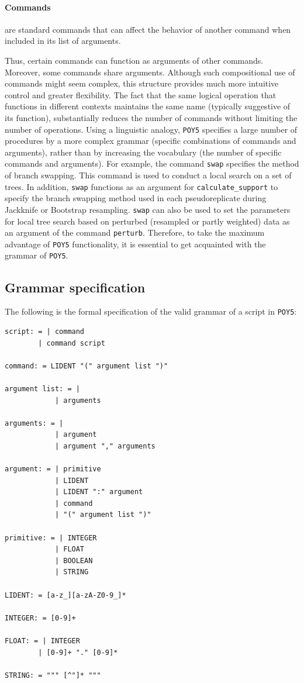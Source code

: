 \documentclass[11pt]{book}
\newcommand{\commandstyle}[1]{\texttt{#1}}
\newcommand{\poycommand}[1]{\commandstyle{#1}}
\newcommand{\poy}{\commandstyle{POY5}\xspace}
\begin{document}
\paragraph{Commands} are standard commands that can affect the behavior of
another command when included in its list of arguments.

Thus, certain commands can function as arguments of other commands. Moreover,
some commands share arguments. Although such compositional use of commands
might seem complex, this structure provides much more intuitive
control and greater flexibility. The fact that the same logical operation that functions
in different contexts maintains
the same name (typically suggestive of its function), substantially reduces the number of
commands without limiting the number of operations. Using a linguistic analogy,
\poy specifies a large number of procedures by a more complex grammar (specific
combinations of commands and arguments), rather than by increasing the vocabulary
(the number of specific commands and arguments). For example, the command
\poycommand{swap} specifies the method of branch swapping. This command is
used to conduct a local search on a set of trees. In addition,
\poycommand{swap} functions as an argument for \poycommand{calculate\_support}
to specify the branch swapping method used in each pseudoreplicate during Jackknife or
Bootstrap resampling. \poycommand{swap} can also be used to set the parameters for
local tree search based on perturbed (resampled or partly weighted) data as an argument
of the command \poycommand{perturb}. Therefore, to take the maximum advantage of
\poy functionality, it is essential to get acquainted with the grammar of  \poy.

\subsection{Grammar specification}

The following is the formal specification of the valid grammar of a script in \poy:

\begin{verbatim}
script: = | command
        | command script

command: = LIDENT "(" argument list ")"

argument list: = |
            | arguments

arguments: = |
            | argument
            | argument "," arguments

argument: = | primitive
            | LIDENT
            | LIDENT ":" argument
            | command
            | "(" argument list ")"

primitive: = | INTEGER
            | FLOAT
            | BOOLEAN
            | STRING

LIDENT: = [a-z_][a-zA-Z0-9_]*

INTEGER: = [0-9]+

FLOAT: = | INTEGER
        | [0-9]+ "." [0-9]*

STRING: = """ [^"]* """


\end{verbatim}
\end{document}
